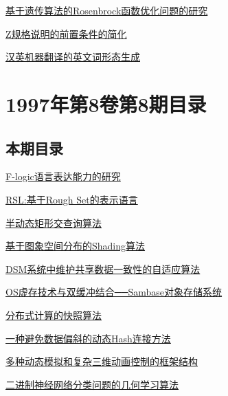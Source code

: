 \documentclass[a4paper]{article}
\begin{document}
\href{http://www.jos.org.cn/ch/reader/download_pdf.aspx?file_no=19970909&year_id=1997&quarter_id=9&falg=1}{基于遗传算法的Rosenbrock函数优化问题的研究}

\href{http://www.jos.org.cn/ch/reader/download_pdf.aspx?file_no=19970910&year_id=1997&quarter_id=9&falg=1}{Z规格说明的前置条件的简化}

\href{http://www.jos.org.cn/ch/reader/download_pdf.aspx?file_no=19970911&year_id=1997&quarter_id=9&falg=1}{汉英机器翻译的英文词形态生成}


\section{\textbf{1997年第8卷第8期目录}}
\subsection{本期目录}
\href{http://www.jos.org.cn/ch/reader/download_pdf.aspx?file_no=19970801&year_id=1997&quarter_id=8&falg=1}{F-logic语言表达能力的研究}

\href{http://www.jos.org.cn/ch/reader/download_pdf.aspx?file_no=19970802&year_id=1997&quarter_id=8&falg=1}{RSL:基于Rough Set的表示语言}

\href{http://www.jos.org.cn/ch/reader/download_pdf.aspx?file_no=19970803&year_id=1997&quarter_id=8&falg=1}{半动态矩形交查询算法}

\href{http://www.jos.org.cn/ch/reader/download_pdf.aspx?file_no=19970804&year_id=1997&quarter_id=8&falg=1}{基于图象空间分布的Shading算法}

\href{http://www.jos.org.cn/ch/reader/download_pdf.aspx?file_no=19970805&year_id=1997&quarter_id=8&falg=1}{DSM系统中维护共享数据一致性的自适应算法}

\href{http://www.jos.org.cn/ch/reader/download_pdf.aspx?file_no=19970806&year_id=1997&quarter_id=8&falg=1}{OS虚存技术与双缓冲结合──Sambase对象存储系统}

\href{http://www.jos.org.cn/ch/reader/download_pdf.aspx?file_no=19970807&year_id=1997&quarter_id=8&falg=1}{分布式计算的快照算法}

\href{http://www.jos.org.cn/ch/reader/download_pdf.aspx?file_no=19970808&year_id=1997&quarter_id=8&falg=1}{一种避免数据偏斜的动态Hash连接方法}

\href{http://www.jos.org.cn/ch/reader/download_pdf.aspx?file_no=19970809&year_id=1997&quarter_id=8&falg=1}{多种动态模拟和复杂三维动画控制的框架结构}

\href{http://www.jos.org.cn/ch/reader/download_pdf.aspx?file_no=19970810&year_id=1997&quarter_id=8&falg=1}{二进制神经网络分类问题的几何学习算法}
\end{document}
